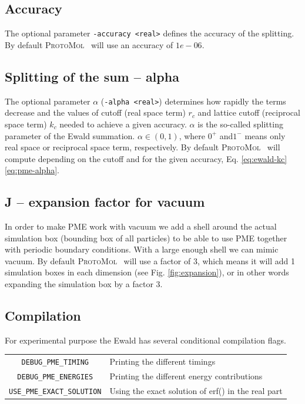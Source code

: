 \documentclass[11pt]{article}
\newcommand{\ProtoMol}{\textsc{ProtoMol }}
\begin{document}
\subsection{Accuracy}

The optional parameter \texttt{-accuracy <real>} defines the accuracy
of the splitting. By default \ProtoMol\ will use an accuracy of
$1e-06$.

\subsection{Splitting of the sum -- alpha}


The optional parameter $\alpha$ (\texttt{-alpha <real>}) determines how rapidly
the terms
decrease and the values of cutoff (real space term) $r_c$ and lattice
cutoff (reciprocal space term) $k_c$ needed to achieve a given
accuracy. $\alpha$ is the so-called splitting parameter of the Ewald
summation. $\alpha \in (0,1)$, where $0^+$ and$1^-$ means only real
space or reciprocal space term, respectively. By default \ProtoMol\ will compute depending on the cutoff and for
the given accuracy, Eq. \ref{eq:ewald-kc}\ref{eq:pme-alpha}.

\subsection{J -- expansion factor for vacuum}

In order to make PME work with vacuum we add a
shell around the actual simulation box (bounding box of all particles)
to be able to use PME together with periodic boundary conditions. With a large enough shell we can mimic vacuum. By default \ProtoMol\ will use a factor of 3, which
means it will add 1 simulation boxes in each dimension (see
Fig. \ref{fig:expansion}), or in other words expanding the simulation
box by a factor 3.


\subsection{Compilation}

For experimental purpose the Ewald has several conditional compilation
flags.\\
\begin{tabular}{cp{10cm}}
\texttt{\small DEBUG\_PME\_TIMING}        & Printing the different timings\\
\texttt{\small DEBUG\_PME\_ENERGIES}      & Printing the different energy contributions\\
\texttt{\small USE\_PME\_EXACT\_SOLUTION}& Using the exact solution of erf() in the real part\\
\end{tabular}




\end{document}
